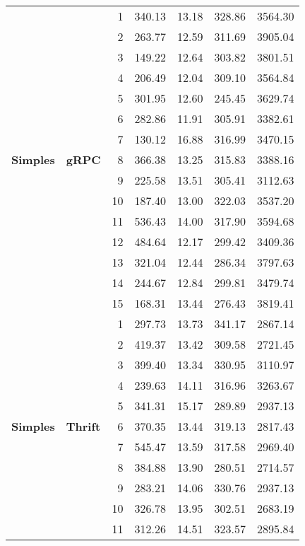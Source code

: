 \begin{longtable}{@{} llrrrrr @{}}
    \multirow{15}{*}{\textbf{Simples}} & \multirow{15}{*}{\textbf{gRPC}} 
        & 1 & 340.13 & 13.18 & 328.86 & 3564.30 \\
        & & 2 & 263.77 & 12.59 & 311.69 & 3905.04 \\
        & & 3 & 149.22 & 12.64 & 303.82 & 3801.51 \\
        & & 4 & 206.49 & 12.04 & 309.10 & 3564.84 \\
        & & 5 & 301.95 & 12.60 & 245.45 & 3629.74 \\
        & & 6 & 282.86 & 11.91 & 305.91 & 3382.61 \\
        & & 7 & 130.12 & 16.88 & 316.99 & 3470.15 \\
        & & 8 & 366.38 & 13.25 & 315.83 & 3388.16 \\
        & & 9 & 225.58 & 13.51 & 305.41 & 3112.63 \\
        & & 10 & 187.40 & 13.00 & 322.03 & 3537.20 \\
        & & 11 & 536.43 & 14.00 & 317.90 & 3594.68 \\
        & & 12 & 484.64 & 12.17 & 299.42 & 3409.36 \\
        & & 13 & 321.04 & 12.44 & 286.34 & 3797.63 \\
        & & 14 & 244.67 & 12.84 & 299.81 & 3479.74 \\
        & & 15 & 168.31 & 13.44 & 276.43 & 3819.41 \\
    \cline{2-7}
    \multirow{15}{*}{\textbf{Simples}} & \multirow{15}{*}{\textbf{Thrift}} 
        & 1 & 297.73 & 13.73 & 341.17 & 2867.14 \\
        & & 2 & 419.37 & 13.42 & 309.58 & 2721.45 \\
        & & 3 & 399.40 & 13.34 & 330.95 & 3110.97 \\
        & & 4 & 239.63 & 14.11 & 316.96 & 3263.67 \\
        & & 5 & 341.31 & 15.17 & 289.89 & 2937.13 \\
        & & 6 & 370.35 & 13.44 & 319.13 & 2817.43 \\
        & & 7 & 545.47 & 13.59 & 317.58 & 2969.40 \\
        & & 8 & 384.88 & 13.90 & 280.51 & 2714.57 \\
        & & 9 & 283.21 & 14.06 & 330.76 & 2937.13 \\
        & & 10 & 326.78 & 13.95 & 302.51 & 2683.19 \\
        & & 11 & 312.26 & 14.51 & 323.57 & 2895.84 \\

\end{longtable}
